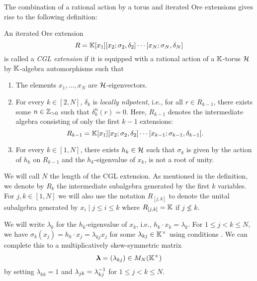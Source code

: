 The combination of a rational action by a torus and iterated Ore extensions gives rise
to the following definition:
\begin{definition}\label{def:cgl_extension}
	An iterated Ore extension
	\begin{equation*}
		R = \mathbb{K}[x_1][x_2; \sigma_2, \delta_2]\cdots [x_N; \sigma_N, \delta_N]
	\end{equation*}
	is called a \emph{CGL extension} if it is equipped with a rational action of a $\mathbb{K}$-torus $\mathcal{H}$ by $\mathbb{K}$-algebra automorphisms such that
	\begin{enumerate}
		\item\label{itm:x_i-eigenvectors} The elements $x_1, \dots, x_N$ are $\mathcal{H}$-eigenvectors.
		\item For every $k\in [2, N]$, $\delta_k$ is \emph{locally
			      nilpotent}, i.e., for all $r \in R_{k-1}$, there exists some
		      $n \in \mathbb{Z}_{>0}$ such that $\delta_k^n (r) = 0$. Here, $R_{k-1}$ denotes the
		      intermediate algebra consisting of only the first $k-1$ extensions:
		      \begin{equation*}
			      R_{k-1} = \mathbb{K}[x_1][x_2; \sigma_2, \delta_2]\cdots[x_{k-1};\sigma_{k-1}, \delta_{k-1}].
		      \end{equation*}
		      \item\label{itm:sigma_k-is-h_k} For every $k \in [1, N]$, there exists $h_k \in \mathcal{H}$ such that $\sigma_k$ is given by the action of $h_k$ on $R_{k-1}$ and the $h_k$-eigenvalue of $x_k$, is not a root of unity.
	\end{enumerate}
\end{definition}

We will call $N$ the length of the CGL extension. As
mentioned in the definition, we denote by $R_k$ the intermediate subalgebra generated
by the first $k$ variables. For $j, k \in [1, N]$ we will also use the notation $R_{[j,
					k]}$ to denote the unital subalgebra generated by ${x_i \mid j \leq i \leq k}$ where
$R_{[j, k]} = \mathbb{K}$ if $j \nleq k$.

We will write $\lambda_k$ for the $h_k$-eigenvalue of $x_k$, i.e., $h_k \cdot x_k =
	\lambda_k$. For $1 \leq j < k \leq N$, we have $\sigma_k (x_j) = h_k \cdot x_j =
	\lambda_{kj} x_j$ for some $\lambda_{kj} \in \mathbb{K}^\times$ using conditions
. We can complete this to a
multiplicatively skew-symmetric matrix
\begin{equation}\label{eq:CGL_lambda}
	\boldsymbol{\lambda}= (\lambda_{kj}) \in M_N(\mathbb{K}^\times)
\end{equation}
%
by setting $\lambda_{kk} = 1$ and $\lambda_{jk} = \lambda_{kj}^{-1}$ for $1 \leq j < k
	\leq N$.

